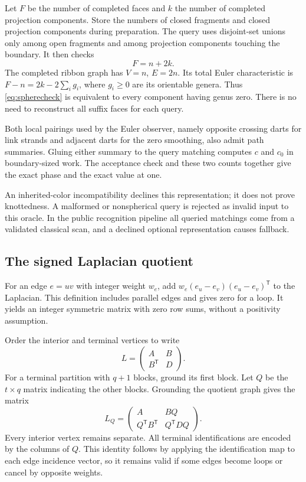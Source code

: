 Let $F$ be the number of completed faces and $k$ the number of completed
projection components. Store the numbers of closed fragments and closed
projection components during preparation. The query uses disjoint-set unions
only among open fragments and among projection components touching the
boundary. It then checks
\begin{equation}
                              F=n+2k.
 \label{eq:spherecheck}
\end{equation}
The completed ribbon graph has $V=n$, $E=2n$. Its total Euler characteristic
is $F-n=2k-2\sum_i g_i$, where $g_i\ge0$ are its orientable genera. Thus
\cref{eq:spherecheck} is equivalent to every component having genus zero.
There is no need to reconstruct all suffix faces for each query.

Both local pairings used by the Euler observer, namely opposite crossing
darts for link strands and adjacent darts for the zero smoothing, also admit
path summaries. Gluing either summary to the query matching computes $c$ and
$c_0$ in boundary-sized work. The acceptance check and these two counts together
give the exact phase and the exact value at one.

An inherited-color incompatibility declines this representation; it does not
prove knottedness. A malformed or nonspherical query is rejected as invalid
input to this oracle. In the public recognition pipeline all queried matchings
come from a validated classical scan, and a declined optional representation
causes fallback.

\subsection{The signed Laplacian quotient}

For an edge $e=uv$ with integer weight $w_e$, add
$w_e(e_u-e_v)(e_u-e_v)^{\mathsf T}$ to the Laplacian. This definition includes
parallel edges and gives zero for a loop. It yields an integer symmetric matrix
with zero row sums, without a positivity assumption.

Order the interior and terminal vertices to write
\[
               L=\begin{pmatrix} A&B\\B^{\mathsf T}&D\end{pmatrix}.
\]
For a terminal partition with $q+1$ blocks, ground its first block. Let $Q$
be the $t\times q$ matrix indicating the other blocks. Grounding the quotient
graph gives the matrix
\begin{equation}
 L_Q=\begin{pmatrix}
 A&BQ\\Q^{\mathsf T}B^{\mathsf T}&Q^{\mathsf T}DQ
 \end{pmatrix}.
 \label{eq:quotient}
\end{equation}
Every interior vertex remains separate. All terminal identifications are
encoded by the columns of $Q$. This identity follows by applying the
identification map to each edge incidence vector, so it remains valid if some
edges become loops or cancel by opposite weights.

